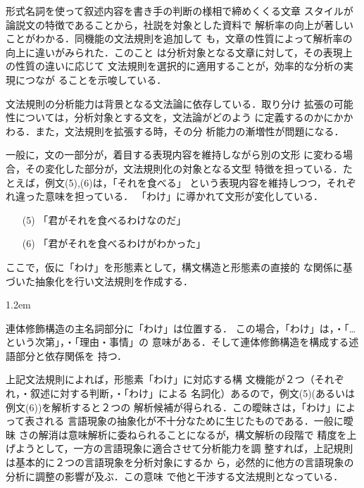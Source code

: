 \vspace*{-2mm}

形式名詞を使って叙述内容を書き手の判断の様相で締めくくる文章
スタイルが論説文の特徴であることから，社説を対象とした資料で
解析率の向上が著しいことがわかる．同機能の文法規則を追加して
も，文章の性質によって解析率の向上に違いがみられた．このこと
は分析対象となる文章に対して，その表現上の性質の違いに応じて
文法規則を選択的に適用することが，効率的な分析の実現につなが
ることを示唆している．

文法規則の分析能力は背景となる文法論に依存している．取り分け
拡張の可能性については，分析対象とする文を，文法論がどのよう
に定義するのかにかかわる．また，文法規則を拡張する時，その分
析能力の漸増性が問題になる．

一般に，文の一部分が，着目する表現内容を維持しながら別の文形
に変わる場合，その変化した部分が，文法規則化の対象となる文型
特徴を担っている．たとえば，例文(5),(6)は，「それを食べる」
という表現内容を維持しつつ，それぞれ違った意味を担っている．
「わけ」に導かれて文形が変化している．

\begin{itemize}\baselineskip1.2em
\item [(5)] 「君がそれを食べるわけなのだ」
\item [(6)] 「君がそれを食べるわけがわかった」
\end{itemize}

ここで，仮に「わけ」を形態素として，構文構造と形態素の直接的
な関係に基づいた抽象化を行い文法規則を作成する．

\smallskip

\begin{description}\baselineskip1.2em
\item [規則] 連体修飾構造の主名詞部分に「わけ」は位置する．
この場合，「わけ」は，・「…という次第」，・「理由・事情」の
意味がある．そして連体修飾構造を構成する述語部分と依存関係を
持つ．
\end{description}

\smallskip

{\noindent 上記文法規則によれば，形態素「わけ」に対応する構
文機能が２つ（それぞれ，・叙述に対する判断，・「わけ」による
名詞化）あるので，例文(5)(あるいは例文(6))を解析すると２つの
解析候補が得られる．}この曖昧さは，「わけ」によって表される
言語現象の抽象化が不十分なために生じたものである．一般に曖昧
さの解消は意味解析に委ねられることになるが，構文解析の段階で
精度を上げようとして，一方の言語現象に適合させて分析能力を調
整すれば，上記規則は基本的に２つの言語現象を分析対象にするか
ら，必然的に他方の言語現象の分析に調整の影響が及ぶ．この意味
で他と干渉する文法規則となっている．

